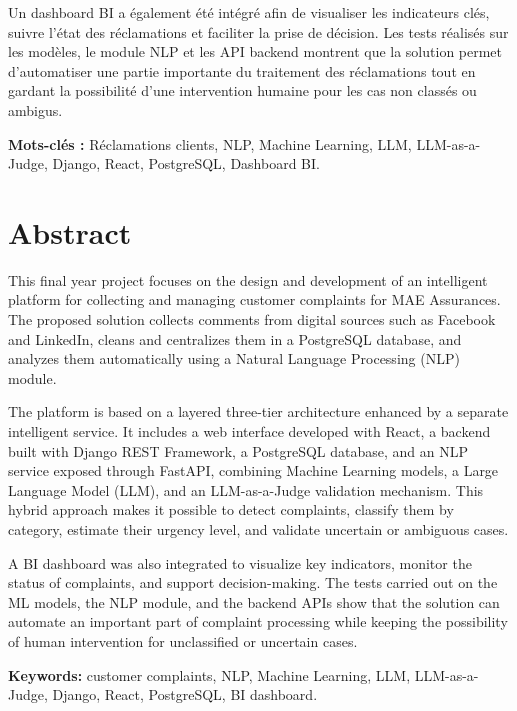 \documentclass[12pt,a4paper,oneside]{report}
\begin{document}
Un dashboard BI a également été intégré afin de visualiser les indicateurs clés, suivre l’état des réclamations et faciliter la prise de décision. Les tests réalisés sur les modèles, le module NLP et les API backend montrent que la solution permet d’automatiser une partie importante du traitement des réclamations tout en gardant la possibilité d’une intervention humaine pour les cas non classés ou ambigus.

\textbf{Mots-clés :} Réclamations clients, NLP, Machine Learning, LLM, LLM-as-a-Judge, Django, React, PostgreSQL, Dashboard BI.



\clearpage

\chapter*{Abstract}

This final year project focuses on the design and development of an intelligent platform for collecting and managing customer complaints for MAE Assurances. The proposed solution collects comments from digital sources such as Facebook and LinkedIn, cleans and centralizes them in a PostgreSQL database, and analyzes them automatically using a Natural Language Processing (NLP) module.

The platform is based on a layered three-tier architecture enhanced by a separate intelligent service. It includes a web interface developed with React, a backend built with Django REST Framework, a PostgreSQL database, and an NLP service exposed through FastAPI, combining Machine Learning models, a Large Language Model (LLM), and an LLM-as-a-Judge validation mechanism. This hybrid approach makes it possible to detect complaints, classify them by category, estimate their urgency level, and validate uncertain or ambiguous cases.

A BI dashboard was also integrated to visualize key indicators, monitor the status of complaints, and support decision-making. The tests carried out on the ML models, the NLP module, and the backend APIs show that the solution can automate an important part of complaint processing while keeping the possibility of human intervention for unclassified or uncertain cases.

\textbf{Keywords:} customer complaints, NLP, Machine Learning, LLM, LLM-as-a-Judge, Django, React, PostgreSQL, BI dashboard.

\clearpage

\tableofcontents
\clearpage
\end{document}
